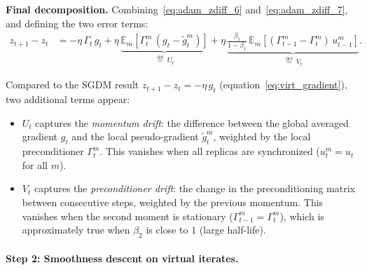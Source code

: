 \documentclass{article}
\begin{document}
\medskip
\noindent\textbf{Final decomposition.}
Combining~\eqref{eq:adam_zdiff_6} and~\eqref{eq:adam_zdiff_7}, and defining
the two error terms:
\begin{align}
z_{t+1} - z_t
&= -\eta\,\Gamma_t\,g_t
   + \eta\,\underbrace{\mathbb{E}_m[\Gamma_t^m\,(g_t - \widetilde{g}_t^m)]
   }_{\stackrel{\text{def}}{=}\;U_t}
   + \eta\,\underbrace{\frac{\beta_1}{1-\beta_1}\,
   \mathbb{E}_m[(\Gamma_{t-1}^m - \Gamma_t^m)\,u_{t-1}^m]
   }_{\stackrel{\text{def}}{=}\;V_t}.
\label{eq:adam_zdiff_final}
\end{align}

Compared to the SGDM result $z_{t+1} - z_t = -\eta\,g_t$
(equation~\eqref{eq:virt_gradient}), two additional terms appear:

\begin{itemize}
\item $U_t$ captures the \emph{momentum drift}: the difference between the
  global averaged gradient $g_t$ and the local pseudo-gradient
  $\widetilde{g}_t^m$, weighted by the local preconditioner $\Gamma_t^m$.
  This vanishes when all replicas are synchronized ($u_t^m = u_t$ for all $m$).

\item $V_t$ captures the \emph{preconditioner drift}: the change in the
  preconditioning matrix between consecutive steps, weighted by the previous
  momentum. This vanishes when the second moment is stationary
  ($\Gamma_{t-1}^m = \Gamma_t^m$), which is approximately true when $\beta_2$
  is close to $1$ (large half-life).
\end{itemize}

\paragraph{Step 2: Smoothness descent on virtual iterates.}
\end{document}

